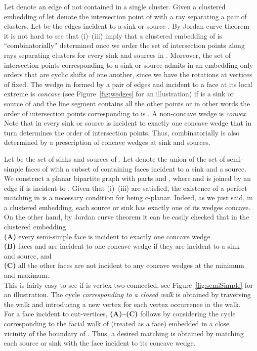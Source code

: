 \documentclass{llncs}
\newif\iflong
\begin{document}
Let  denote an edge of  not contained in a single 
cluster.
Given a clustered embedding  of  let  denote the intersection point of  with a ray separating a pair of clusters.
Let  be  the  edges
 incident to a sink or source .
By Jordan curve theorem it is not hard to see that (i)--(iii) imply that a clustered embedding  of  is ``combinatorially'' determined once we order the set 
  of intersection points
  along
 rays separating clusters for every sink and sources  in . Moreover, the set of intersection points corresponding to a sink or source  admits in
 an embedding only orders that are cyclic shifts of
 one another, since we have the rotations at vertices 
 of  fixed.
 The wedge in  formed by a pair of edges  and  incident to a face  at its local extreme  is \emph{concave} (see Figure~\ref{fig:wedges} 
 for an illustration) if 
 is a sink or source of  and
the line segment  contains all the other points  or
in other words the order of intersection points
corresponding to  is .
A non-concave wedge is \emph{convex}.\iflong\footnote{The terminology comes from the fact that in an embedding that is ``combinatorially the same'' with straight line edges, wedges become convex and concave in the usual sense.}\fi
Note that in  every sink or source is
incident to exactly one concave wedge that in
turn determines the order of intersection points.
Thus, combinatorially  is also determined
by a prescription of concave wedges at sink and sources.

Let   be the set of sinks and sources of . Let  denote the union of the set of 
semi-simple faces of  with a subset of  containing faces incident to a sink and a source.
We construct a planar bipartite graph  with parts  and ,
 where  and 
is joined by an edge if  is incident to . 
Given that (i)--(iii) are satisfied, the existence of a perfect matching  in  is a necessary condition for  being c-planar. Indeed, as we just said,
in a clustered embedding, each source or sink has exactly one of its wedges concave.
On the other hand, by Jordan curve theorem  it  can be easily checked that in the clustered embedding  \\
{\bf (A)} every semi-simple face is incident to exactly one concave wedge \\
{\bf (B)} faces  and  are incident to one concave wedge if they are incident to a sink and source, and \\ {\bf (C)} all the other faces are not incident to any concave wedges at the minimum and maximum. \\
This is fairly easy to see if  is vertex two-connected, see Figure~\ref{fig:semiSimple} for an illustration.
The cycle  \emph{corresponding to a closed walk} is obtained
by traversing the walk and introducing a new vertex for each
vertex occurrence in the walk.
For a face  incident to cut-vertices, {\bf (A)--(C)} follows by considering the cycle corresponding to the facial walk of  (treated as a face) embedded in a close vicinity of the boundary of . 
 Thus, a desired matching  is obtained by matching each source or sink with
the face incident to its concave wedge.
\end{document}
